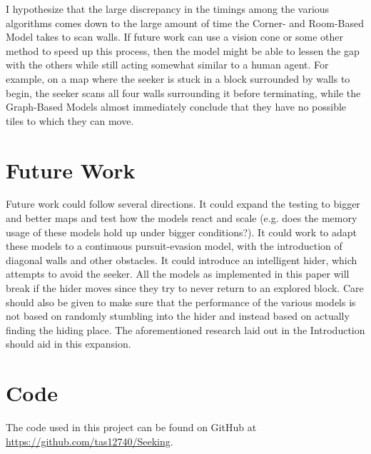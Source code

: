 \documentclass[12pt]{article}
\begin{document}
I hypothesize that the large discrepancy in the timings among the various algorithms comes down to the large amount of time the Corner- and Room-Based Model takes to scan walls. If future work can use a vision cone or some other method to speed up this process, then the model might be able to lessen the gap with the others while still acting somewhat similar to a human agent. For example, on a map where the seeker is stuck in a block surrounded by walls to begin, the seeker scans all four walls surrounding it before terminating, while the Graph-Based Models almost immediately conclude that they have no possible tiles to which they can move. 

\section{Future Work}
Future work could follow several directions. It could expand the testing to bigger and better maps and test how the models react and scale (e.g. does the memory usage of these models hold up under bigger conditions?). It could work to adapt these models to a continuous pursuit-evasion model, with the introduction of diagonal walls and other obstacles. It could introduce an intelligent hider, which attempts to avoid the seeker. All the models as implemented in this paper will break if the hider moves since they try to never return to an explored block. Care should also be given to make sure that the performance of the various models is not based on randomly stumbling into the hider and instead based on actually finding the hiding place. The aforementioned research laid out in the Introduction should aid in this expansion. 

\appendix
\appendixpage

\section{Code}
The code used in this project can be found on GitHub at \url{https://github.com/tas12740/Seeking}.



\end{document}
